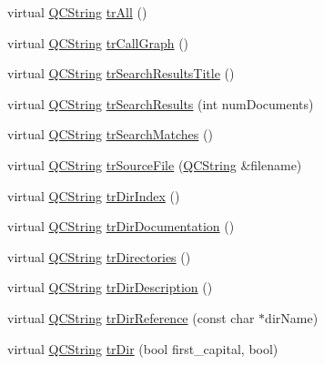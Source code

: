 \begin{DoxyCompactItemize}
virtual \mbox{\hyperlink{class_q_c_string}{Q\+C\+String}} \mbox{\hyperlink{class_translator_indonesian_aaaf070af56dca64079303a05695a3eb6}{tr\+All}} ()
\item 
virtual \mbox{\hyperlink{class_q_c_string}{Q\+C\+String}} \mbox{\hyperlink{class_translator_indonesian_a588a9c74b44b41f44369be75533f9a8c}{tr\+Call\+Graph}} ()
\item 
virtual \mbox{\hyperlink{class_q_c_string}{Q\+C\+String}} \mbox{\hyperlink{class_translator_indonesian_a803f950a37f6e33a1dbefc346591c50f}{tr\+Search\+Results\+Title}} ()
\item 
virtual \mbox{\hyperlink{class_q_c_string}{Q\+C\+String}} \mbox{\hyperlink{class_translator_indonesian_a050dc79ac095dd5dfc64f1c2698fef4d}{tr\+Search\+Results}} (int num\+Documents)
\item 
virtual \mbox{\hyperlink{class_q_c_string}{Q\+C\+String}} \mbox{\hyperlink{class_translator_indonesian_af595203553ea2b4ad1fa441e693d5bba}{tr\+Search\+Matches}} ()
\item 
virtual \mbox{\hyperlink{class_q_c_string}{Q\+C\+String}} \mbox{\hyperlink{class_translator_indonesian_a6369756ab29fc9c434408787414f628d}{tr\+Source\+File}} (\mbox{\hyperlink{class_q_c_string}{Q\+C\+String}} \&filename)
\item 
virtual \mbox{\hyperlink{class_q_c_string}{Q\+C\+String}} \mbox{\hyperlink{class_translator_indonesian_a8159914635e87d6c5dda4c1ed48095c5}{tr\+Dir\+Index}} ()
\item 
virtual \mbox{\hyperlink{class_q_c_string}{Q\+C\+String}} \mbox{\hyperlink{class_translator_indonesian_a0ad6dfb602e4a87ff07eec996efd1ef0}{tr\+Dir\+Documentation}} ()
\item 
virtual \mbox{\hyperlink{class_q_c_string}{Q\+C\+String}} \mbox{\hyperlink{class_translator_indonesian_ad02ff0b4defce647958f347763fab20d}{tr\+Directories}} ()
\item 
virtual \mbox{\hyperlink{class_q_c_string}{Q\+C\+String}} \mbox{\hyperlink{class_translator_indonesian_a40c06db925621c70c01a85305333bbff}{tr\+Dir\+Description}} ()
\item 
virtual \mbox{\hyperlink{class_q_c_string}{Q\+C\+String}} \mbox{\hyperlink{class_translator_indonesian_a416032adff144a9abdd5945feaee488f}{tr\+Dir\+Reference}} (const char $\ast$dir\+Name)
\item 
virtual \mbox{\hyperlink{class_q_c_string}{Q\+C\+String}} \mbox{\hyperlink{class_translator_indonesian_acabd31f296daa0346282ce7e3128cc41}{tr\+Dir}} (bool first\+\_\+capital, bool)
\item 

\end{DoxyCompactItemize}
